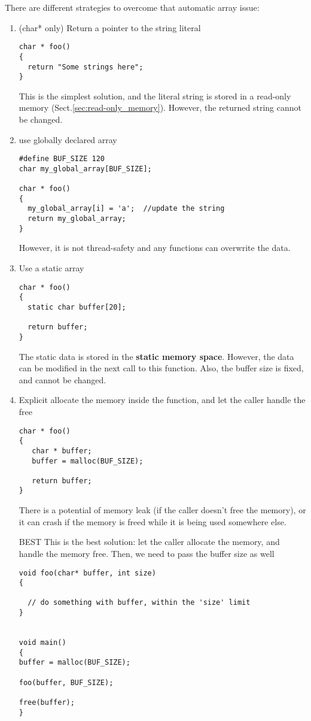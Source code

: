 There are different strategies to overcome that automatic array issue:
\begin{enumerate}
  \item  (char* only) Return a pointer to the string literal
\begin{verbatim}
char * foo() 
{
  return "Some strings here";
}
\end{verbatim} 
This is the simplest solution, and the literal string is stored in a read-only
memory (Sect.\ref{sec:read-only_memory}). However, the returned string cannot be
changed.

  \item use globally declared array
\begin{verbatim}
#define BUF_SIZE 120
char my_global_array[BUF_SIZE];

char * foo()
{
  my_global_array[i] = 'a';  //update the string
  return my_global_array;
}
\end{verbatim}
However, it is not thread-safety and any functions can overwrite the data.

  \item Use a static array
\begin{verbatim}
char * foo()
{
  static char buffer[20];
  
  return buffer;
}
\end{verbatim}
The static data is stored in the {\bf static memory space}.  However, the data
can be modified in the next call to this function. Also, the buffer size is
fixed, and cannot be changed.

  \item Explicit allocate the memory inside the function, and let the caller
  handle the free
\begin{verbatim}
char * foo()
{
   char * buffer;
   buffer = malloc(BUF_SIZE);
   
   return buffer;
}
\end{verbatim}
There is a potential of memory leak (if the caller doesn't free the memory), or
it can crash if the memory is freed while it is being used somewhere else.

   \item [BEST] This is the best solution: let the caller allocate the memory,
   and handle the memory free. Then, we need to pass the buffer size as well
\begin{verbatim}
void foo(char* buffer, int size) 
{

  // do something with buffer, within the 'size' limit
}


void main()
{
buffer = malloc(BUF_SIZE);

foo(buffer, BUF_SIZE);

free(buffer);
}
\end{verbatim}
\end{enumerate}

